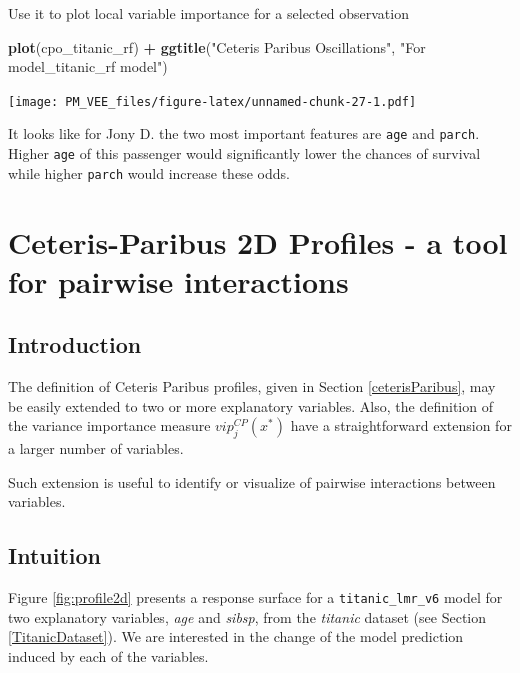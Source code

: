 \documentclass[12pt,]{krantz}
\newenvironment{Shaded}{\begin{snugshade}}{\end{snugshade}}
\newcommand{\KeywordTok}[1]{\textcolor[rgb]{0.13,0.29,0.53}{\textbf{#1}}}
\newcommand{\NormalTok}[1]{#1}
\newcommand{\OperatorTok}[1]{\textcolor[rgb]{0.81,0.36,0.00}{\textbf{#1}}}
\newcommand{\StringTok}[1]{\textcolor[rgb]{0.31,0.60,0.02}{#1}}
\theoremstyle{definition}
\theoremstyle{definition}
\theoremstyle{definition}
\theoremstyle{remark}
\begin{document}
Use it to plot local variable importance for a selected observation

\begin{Shaded}
\begin{Highlighting}[]
\KeywordTok{plot}\NormalTok{(cpo_titanic_rf) }\OperatorTok{+}
\StringTok{  }\KeywordTok{ggtitle}\NormalTok{(}\StringTok{"Ceteris Paribus Oscillations"}\NormalTok{,}
          \StringTok{"For model_titanic_rf model"}\NormalTok{)}
\end{Highlighting}
\end{Shaded}

\texttt{[image: PM\_VEE\_files/figure-latex/unnamed-chunk-27-1.pdf]}

It looks like for Jony D. the two most important features are
\texttt{age} and \texttt{parch}. Higher \texttt{age} of this passenger
would significantly lower the chances of survival while higher
\texttt{parch} would increase these odds.

\hypertarget{ceterisParibus2d}{%
\section{Ceteris-Paribus 2D Profiles - a tool for pairwise
interactions}\label{ceterisParibus2d}}

\hypertarget{introduction-3}{%
\subsection{Introduction}\label{introduction-3}}

The definition of Ceteris Paribus profiles, given in Section
\ref{ceterisParibus}, may be easily extended to two or more explanatory
variables. Also, the definition of the variance importance measure
\(vip^{CP}_j(x^*)\) have a straightforward extension for a larger number
of variables.

Such extension is useful to identify or visualize of pairwise
interactions between variables.

\hypertarget{intuition-2}{%
\subsection{Intuition}\label{intuition-2}}

Figure \ref{fig:profile2d} presents a response surface for a
\texttt{titanic\_lmr\_v6} model for two explanatory variables,
\emph{age} and \emph{sibsp}, from the \emph{titanic} dataset (see
Section \ref{TitanicDataset}). We are interested in the change of the
model prediction induced by each of the variables.
\end{document}
